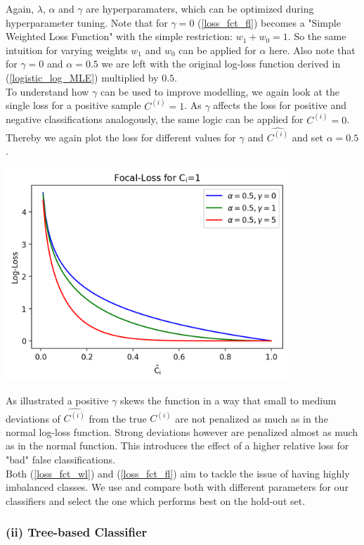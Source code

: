 \documentclass[12pt,titlepage]{article}
\begin{document}
Again, $\lambda$, $\alpha$ and $\gamma$ are hyperparamaters, which can be optimized during hyperparameter tuning. Note that for $\gamma=0$ (\ref{loss_fct_fl}) becomes a "Simple Weighted Loss Function" with the simple restriction: $w_{1}+w_{0}=1$. So the same intuition for varying weights $w_{1}$ and $w_{0}$ can be applied for $\alpha$ here. Also note that for $\gamma=0$ and $\alpha=0.5$ we are left with the original log-loss function derived in (\ref{logistic_log_MLE}) multiplied by $0.5$. \\
To understand how $\gamma$ can be used to improve modelling, we again look at the single loss for a positive sample $C^{(i)}=1$. As $\gamma$ affects the loss for positive and negative classifications analogously, the same logic can be applied for $C^{(i)}=0$. Thereby we again plot the loss for different values for $\gamma$ and $\widehat{C^{(i)}}$ and set $\alpha=0.5$. \\
\centerline{\includegraphics[height=8cm]{focal_loss.png}}
As illustrated a positive $\gamma$ skews the function in a way that small to medium deviations of $\widehat{C^{(i)}}$ from the true $C^{(i)}$ are not penalized as much as in the normal log-loss function. Strong deviations however are penalized almost as much as in the normal function. This introduces the effect of a higher relative loss for "bad" false classifications. \\
Both (\ref{loss_fct_wl}) and (\ref{loss_fct_fl}) aim to tackle the issue of having highly imbalanced classes. We use and compare both with different parameters for our classifiers and select the one which performs best on the hold-out set. \\

\subsubsection*{(ii) Tree-based Classifier}
\end{document}
